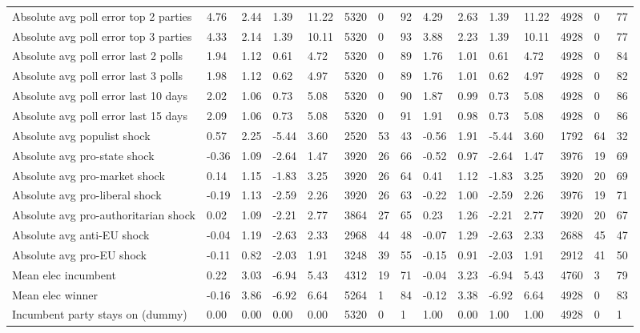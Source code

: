 \begin{longtable}{lllllllllllllll}
Absolute avg poll error top 2 parties & 4.76 & 2.44 & 1.39 & 11.22 & 5320 & 0 & 92 & 4.29 & 2.63 & 1.39 & 11.22 & 4928 & 0 & 77\\
Absolute avg poll error top 3 parties & 4.33 & 2.14 & 1.39 & 10.11 & 5320 & 0 & 93 & 3.88 & 2.23 & 1.39 & 10.11 & 4928 & 0 & 77\\
Absolute avg poll error last 2 polls & 1.94 & 1.12 & 0.61 & 4.72 & 5320 & 0 & 89 & 1.76 & 1.01 & 0.61 & 4.72 & 4928 & 0 & 84\\
\addlinespace
Absolute avg poll error last 3 polls & 1.98 & 1.12 & 0.62 & 4.97 & 5320 & 0 & 89 & 1.76 & 1.01 & 0.62 & 4.97 & 4928 & 0 & 82\\
Absolute avg poll error last 10 days & 2.02 & 1.06 & 0.73 & 5.08 & 5320 & 0 & 90 & 1.87 & 0.99 & 0.73 & 5.08 & 4928 & 0 & 86\\
Absolute avg poll error last 15 days & 2.09 & 1.06 & 0.73 & 5.08 & 5320 & 0 & 91 & 1.91 & 0.98 & 0.73 & 5.08 & 4928 & 0 & 86\\
Absolute avg populist shock & 0.57 & 2.25 & -5.44 & 3.60 & 2520 & 53 & 43 & -0.56 & 1.91 & -5.44 & 3.60 & 1792 & 64 & 32\\
Absolute avg pro-state shock & -0.36 & 1.09 & -2.64 & 1.47 & 3920 & 26 & 66 & -0.52 & 0.97 & -2.64 & 1.47 & 3976 & 19 & 69\\
\addlinespace
Absolute avg pro-market shock & 0.14 & 1.15 & -1.83 & 3.25 & 3920 & 26 & 64 & 0.41 & 1.12 & -1.83 & 3.25 & 3920 & 20 & 69\\
Absolute avg pro-liberal shock & -0.19 & 1.13 & -2.59 & 2.26 & 3920 & 26 & 63 & -0.22 & 1.00 & -2.59 & 2.26 & 3976 & 19 & 71\\
Absolute avg pro-authoritarian shock & 0.02 & 1.09 & -2.21 & 2.77 & 3864 & 27 & 65 & 0.23 & 1.26 & -2.21 & 2.77 & 3920 & 20 & 67\\
Absolute avg anti-EU shock & -0.04 & 1.19 & -2.63 & 2.33 & 2968 & 44 & 48 & -0.07 & 1.29 & -2.63 & 2.33 & 2688 & 45 & 47\\
Absolute avg pro-EU shock & -0.11 & 0.82 & -2.03 & 1.91 & 3248 & 39 & 55 & -0.15 & 0.91 & -2.03 & 1.91 & 2912 & 41 & 50\\
\addlinespace
Mean elec incumbent & 0.22 & 3.03 & -6.94 & 5.43 & 4312 & 19 & 71 & -0.04 & 3.23 & -6.94 & 5.43 & 4760 & 3 & 79\\
Mean elec winner & -0.16 & 3.86 & -6.92 & 6.64 & 5264 & 1 & 84 & -0.12 & 3.38 & -6.92 & 6.64 & 4928 & 0 & 83\\
Incumbent party stays on (dummy) & 0.00 & 0.00 & 0.00 & 0.00 & 5320 & 0 & 1 & 1.00 & 0.00 & 1.00 & 1.00 & 4928 & 0 & 1\\

\end{longtable}
